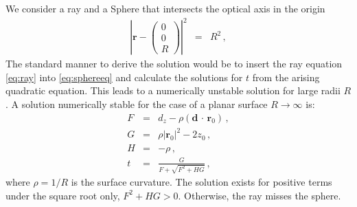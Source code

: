 \documentclass[12pt,a4paper,twoside,openright,BCOR10mm,headsepline,titlepage,abstracton,chapterprefix,final]{scrreprt}
\newcommand\Vector[1]{{\mathbf{#1}}}
\newcommand\Location{\Vector{r}}
\newcommand{\scpm}[2]{(#1\,\cdot\,#2)}
\begin{document}
We consider a ray and a Sphere that intersects the optical axis in the origin
\begin{eqnarray}
 \left| \Location - \begin{pmatrix} 0 \\ 0 \\ R \end{pmatrix} \right|^2 &=& R^2\,, \label{eq:sphereeq}
\end{eqnarray}
The standard manner to derive the solution would be to insert the ray equation \eqref{eq:ray} into
\eqref{eq:sphereeq} and calculate the solutions for $t$ from the arising quadratic equation. This leads to a numerically unstable solution
for large radii $R$.
A solution numerically stable for the case of a planar surface $R \rightarrow \infty$ is:
\begin{subequations}
\label{eq:spheresolution}
\begin{eqnarray}
   F &=& d_z - \rho \scpm{\Vector{d}}{\Location_0}\,, \\
   G &=& \rho |\Location_0|^2 - 2 z_0\,, \\
   H &=& - \rho\,, \\
   t &=& \frac{G}{ F + \sqrt{F^2 + H G} }\,, \label{eq:tsolsphere}
\end{eqnarray}
\end{subequations}
where $\rho = 1 / R$ is the surface curvature. 
The solution exists for positive terms under the square root only, $F^2 + H G > 0$. 
Otherwise, the ray misses the sphere.
\end{document}
